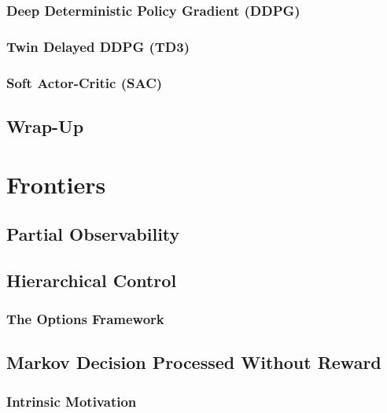 		\subsection{Deep Deterministic Policy Gradient (\acs{DDPG})} %

		\subsection{Twin Delayed DDPG (\acs{TD3})} %

		\subsection{Soft Actor-Critic (\acs{SAC})} %

	\section{Wrap-Up} %

\chapter{Frontiers} %

	\section{Partial Observability} %

	\section{Hierarchical Control} %

		\subsection{The Options Framework} %

	\section{Markov Decision Processed Without Reward} %

		\subsection{Intrinsic Motivation} %

